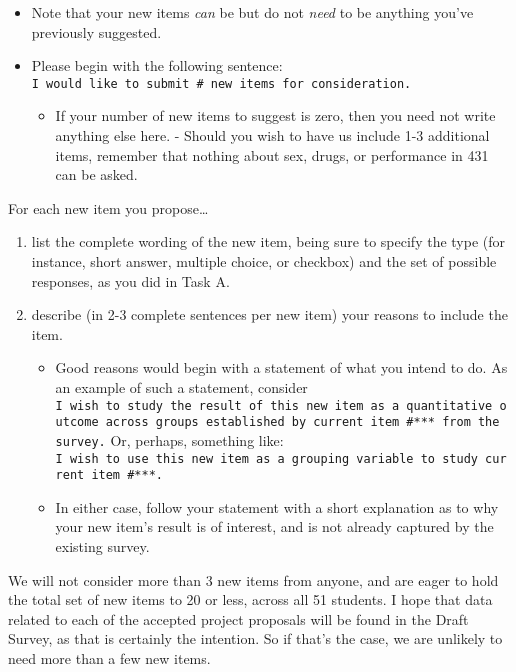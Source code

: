 \documentclass[]{book}
\providecommand{\tightlist}{%
  \setlength{\itemsep}{0pt}\setlength{\parskip}{0pt}}
\theoremstyle{definition}
\theoremstyle{definition}
\theoremstyle{definition}
\theoremstyle{remark}
\begin{document}
\begin{itemize}
\tightlist
\item
  Note that your new items \emph{can} be but do not \emph{need} to be
  anything you've previously suggested.
\item
  Please begin with the following sentence:
  \texttt{I\ would\ like\ to\ submit\ \#\ new\ items\ for\ consideration.}

  \begin{itemize}
  \tightlist
  \item
    If your number of new items to suggest is zero, then you need not
    write anything else here. - Should you wish to have us include 1-3
    additional items, remember that nothing about sex, drugs, or
    performance in 431 can be asked.
  \end{itemize}
\end{itemize}

For each new item you propose\ldots{}

\begin{enumerate}
\def\labelenumi{\arabic{enumi}.}
\tightlist
\item
  list the complete wording of the new item, being sure to specify the
  type (for instance, short answer, multiple choice, or checkbox) and
  the set of possible responses, as you did in Task A.
\item
  describe (in 2-3 complete sentences per new item) your reasons to
  include the item.

  \begin{itemize}
  \tightlist
  \item
    Good reasons would begin with a statement of what you intend to do.
    As an example of such a statement, consider
    \texttt{I\ wish\ to\ study\ the\ result\ of\ this\ new\ item\ as\ a\ quantitative\ outcome\ across\ groups\ established\ by\ current\ item\ \#***\ from\ the\ survey.}
    Or, perhaps, something like:
    \texttt{I\ wish\ to\ use\ this\ new\ item\ as\ a\ grouping\ variable\ to\ study\ current\ item\ \#***.}
  \item
    In either case, follow your statement with a short explanation as to
    why your new item's result is of interest, and is not already
    captured by the existing survey.
  \end{itemize}
\end{enumerate}

We will not consider more than 3 new items from anyone, and are eager to
hold the total set of new items to 20 or less, across all 51 students. I
hope that data related to each of the accepted project proposals will be
found in the Draft Survey, as that is certainly the intention. So if
that's the case, we are unlikely to need more than a few new items.
\end{document}

